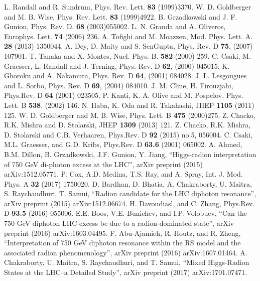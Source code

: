 \documentclass[12pt]{article}
\begin{document}
\begin{thebibliography}{11}
L. Randall and R. Sundrum, Phys. Rev. Lett. {\bf 83} (1999)3370.
W. D. Goldberger and M. B. Wise, Phys. Rev. Lett. {\bf 83} (1999)4922.
B. Grzadkowski and J. F. Gunion, Phys. Rev. D. {\bf 68} (2003)055002.
L. N. Granda and A. Oliveros, Europhys. Lett. {\bf 74} (2006) 236.
A. Tofighi and M. Moazzen, Mod. Phys. Lett. A. {\bf 28} (2013)
1350044.
 A. Dey, D. Maity and S. SenGupta,
 Phys. Rev. D {\bf 75}, (2007) 107901.
T. Tanaka and X. Montes, Nucl. Phys. B. {\bf 582}  (2000) 259.
 C. Csaki, M. Graesser, L. Randall and J. Terning,
 Phys. Rev. D {\bf 62}, (2000) 045015.
K. Ghoroku and A. Nakamura, Phys. Rev. D {\bf 64}, (2001) 084028.
J. L. Lesgougues and L. Sorbo, Phys. Rev. D {\bf 69}, (2004) 084010.
J. M. Cline, H. Firouzjahi, Phys.Rev. D {\bf 64} (2001) 023505.
P. Kanti, K. A. Olive and M. Pospelov, Phys. Lett. B {\bf 538},
(2002) 146.
 N. Haba, K. Oda and R. Takahashi, JHEP {\bf 1105} (2011)
125.
W. D. Goldberger and M. B. Wise, Phys. Lett. B {\bf 475} (2000)275.
Z. Chacko, R.K. Mishra and D. Stolarski, JHEP {\bf 1309} (2013) 121.
Z. Chacko, R.K. Mishra, D. Stolarski and C.B. Verhaaren, Phys.Rev. D {\bf 92} (2015) no.5, 056004.
C. Csaki, M.L. Graesser, and G.D. Kribs, Phys.Rev. D {\bf63.6} (2001) 065002.
A. Ahmed, B.M. Dillon, B. Grzadkowski, J.F. Gunion, Y. Jiang, ``Higgs-radion interpretation of 750 GeV di-photon excess at the LHC'', arXiv preprint (2015) arXiv:1512.05771.
P. Cox, A.D. Medina, T.S. Ray, and A. Spray, Int. J. Mod. Phys. A {\bf 32} (2017) 1750020.
D. Bardhan, D. Bhatia, A. Chakraborty, U. Maitra, S. Raychaudhuri, T. Samui, ``Radion candidate for the LHC diphoton resonance'', arXiv preprint (2015) arXiv:1512.06674.
H. Davoudiasl, and C. Zhang, Phys.Rev. D {\bf93.5} (2016) 055006.
E.E. Boos, V.E. Bunichev, and I.P. Volobuev, ``Can the 750 GeV diphoton LHC excess be due to a radion-dominated state'', arXiv preprint (2016) arXiv:1603.04495.
F. Abu-Ajamieh, R. Houtz, and R. Zheng, ``Interpretation of 750 GeV diphoton resonance within the RS model and the associated radion phenomenology'', arXiv preprint (2016) arXiv:1607.01464.
A. Chakraborty, U. Maitra, S. Raychaudhuri, and T. Samui, ``Mixed Higgs-Radion States at the LHC--a Detailed Study'', arXiv preprint (2017) arXiv:1701.07471.
\end{thebibliography}
\clearpage


\end{document}
